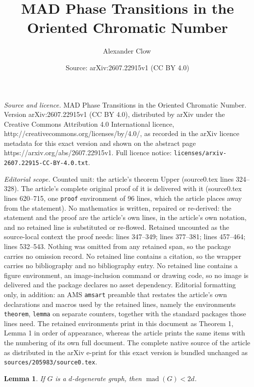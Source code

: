 \documentclass[10pt,a4paper]{amsart}
\title{MAD Phase Transitions in the Oriented Chromatic Number}
\author{Alexander Clow\,}
\date{Source: arXiv:2607.22915v1 (CC BY 4.0)}
\newtheorem{lemma}{Lemma}
\DeclareMathOperator{\mad}{\text{mad}}
\begin{document}
\maketitle

\noindent\emph{Source and licence.} MAD Phase Transitions in the Oriented Chromatic Number. Version arXiv:2607.22915v1 (CC BY 4.0), distributed by arXiv under the Creative Commons Attribution 4.0 International licence, http://creativecommons.org/licenses/by/4.0/, as recorded in the arXiv licence metadata for this exact version and shown on the abstract page https://arxiv.org/abs/2607.22915v1. Full licence notice: \texttt{licenses/arxiv-2607.22915-CC-BY-4.0.txt}.\par\smallskip

\noindent\textit{Editorial scope.} Counted unit: the article's theorem Upper (source0.tex lines 324--328). The article's complete original proof of it is delivered with it (source0.tex lines 620--715, one \texttt{proof} environment of 96 lines, which the article places away from the statement). No mathematics is written, repaired or re-derived: the statement and the proof are the article's own lines, in the article's own notation, and no retained line is substituted or re-flowed.  Retained uncounted as the source-local context the proof needs: lines 347--349; lines 377--381; lines 457--464; lines 532--543.  Nothing was omitted from any retained span, so the package carries no omission record.  No retained line contains a citation, so the wrapper carries no bibliography and no bibliography entry.  No retained line contains a figure environment, an image-inclusion command or drawing code, so no image is delivered and the package declares no asset dependency.  Editorial formatting only, in addition: an AMS \texttt{amsart} preamble that restates the article's own declarations and macros used by the retained lines, namely the environments \texttt{theorem}, \texttt{lemma} on separate counters, together with the standard packages those lines need.  The retained environments print in this document as Theorem 1, Lemma 1 in order of appearance, whereas the article prints the same items with the numbering of its own full document.  The complete native source of the article as distributed in the arXiv e-print for this exact version is bundled unchanged as \texttt{sources/205983/source0.tex}.
\begin{lemma}\label{Lemma: MAD}
    If $G$ is a $d$-degenerate graph, then $\mad(G) < 2d$.
\end{lemma}
\end{document}
